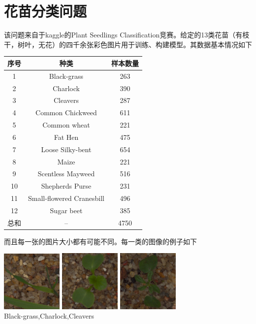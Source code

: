 \section{花苗分类问题}
该问题来自于kaggle的Plant Seedlings Classification竞赛。给定的13类花苗（有枝干，树叶，无花）的四千余张彩色图片用于训练、构建模型。其数据基本情况如下
\begin{center}
\begin{tabular}{ccc}
\toprule[2pt]
序号 & 种类 & 样本数量 \\ 
\midrule[1pt]
1 & Black-grass & 263 \\ 
2 & Charlock & 390 \\ 
3 & Cleavers & 287 \\ 
4 & Common Chickweed & 611 \\ 
5 & Common wheat & 221 \\ 
6 & Fat Hen & 475 \\ 
7 & Loose Silky-bent & 654 \\ 
8 & Maize & 221 \\  
9 & Scentless Mayweed & 516 \\ 
10 & Shepherds Purse & 231 \\ 
11 & Small-flowered Cranesbill & 496 \\ 
12 & Sugar beet & 385 \\ 
\midrule[1pt]
总和 & -- & 4750\\
\bottomrule[2pt]
\end{tabular} 
\end{center}
而且每一张的图片大小都有可能不同。每一类的图像的例子如下
\begin{center}
\includegraphics[width=30mm,height=30mm]{../figures/Black-grass_1af1eddd3.png} 
\includegraphics[width=30mm,height=30mm]{../figures/Charlock_0a7e1ca41.png} 	
\includegraphics[width=30mm,height=30mm]{../figures/Cleavers_0a1e622bc.png} 	\\
Black-grass,Charlock,Cleavers
\end{center}
